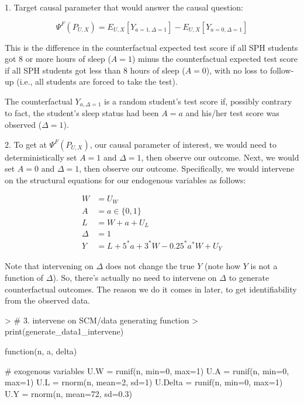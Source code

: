 \documentclass[answers]{exam}
\begin{document}
\begin{solution}


1. Target causal parameter that would answer the causal question:

\[
\Psi^F(P_{U,X}) = E_{U,X}[Y_{a=1, \Delta=1}] - E_{U,X}[Y_{a=0, \Delta=1}]
\]

This is the difference in the counterfactual expected test score if all SPH students got 8 or more hours of sleep ($A=1$) minus the counterfactual expected test score if all SPH students got less than 8 hours of sleep ($A=0$), with no loss to follow-up (i.e., all students are forced to take the test).

The counterfactual $Y_{a,\Delta=1}$ is a random student's test score if, possibly contrary to fact, the student's sleep status had been $A=a$ and his/her test score was observed ($\Delta=1$).

2. To get at $\Psi^F(P_{U,X})$, our causal parameter of interest, we would need to deterministically set $A=1$ and $\Delta=1$, then observe our outcome. Next, we would set $A=0$ and $\Delta=1$, then observe our outcome. Specifically, we would intervene on the structural equations for our endogenous variables as follows:

\begin{align*}
W& = U_W \\
A &  = a \in \{0,1\}\\
L &  = W + a + U_L\\
\Delta & = 1\\
Y & = L + 5^*a + 3^*W - 0.25^*a^*W + U_Y 
\end{align*}

\noindent Note that intervening on $\Delta$ does not change the true $Y$ (note how $Y$ is not a function of $\Delta$). So, there's actually no need to intervene on $\Delta$ to generate counterfactual outcomes. The reason we do it comes in later, to get identifiability from the observed data.



\begin{Schunk}
\begin{Sinput}
> # 3. intervene on SCM/data generating function
> print(generate_data1_intervene)
\end{Sinput}
\begin{Soutput}
function(n, a, delta) {
  
  # exogenous variables
  U.W = runif(n, min=0, max=1)
  U.A = runif(n, min=0, max=1)
  U.L = rnorm(n, mean=2, sd=1)
  U.Delta = runif(n, min=0, max=1)
  U.Y = rnorm(n, mean=72, sd=0.3)
  
}
\end{Soutput}
\end{Schunk}
\end{solution}
\end{document}
